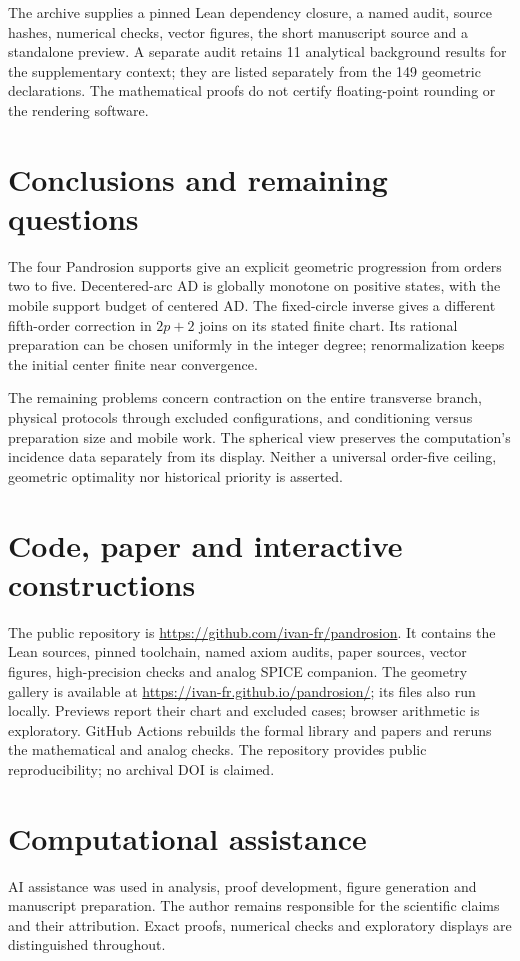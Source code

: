 \documentclass[11pt,a4paper]{article}
\theoremstyle{remark}\newtheorem{remark}[theorem]{Remark}
\begin{document}
The archive supplies a pinned Lean dependency closure, a named audit, source hashes, numerical checks, vector figures, the short manuscript source and a standalone preview. A separate audit retains 11 analytical background results for the supplementary context; they are listed separately from the 149 geometric declarations. The mathematical proofs do not certify floating-point rounding or the rendering software.

\section{Conclusions and remaining questions}
The four Pandrosion supports give an explicit geometric progression from orders two to five. Decentered-arc AD is globally monotone on positive states, with the mobile support budget of centered AD. The fixed-circle inverse gives a different fifth-order correction in $2p+2$ joins on its stated finite chart. Its rational preparation can be chosen uniformly in the integer degree; renormalization keeps the initial center finite near convergence.

The remaining problems concern contraction on the entire transverse branch, physical protocols through excluded configurations, and conditioning versus preparation size and mobile work. The spherical view preserves the computation's incidence data separately from its display. Neither a universal order-five ceiling, geometric optimality nor historical priority is asserted.

\section*{Code, paper and interactive constructions}
The public repository is \url{https://github.com/ivan-fr/pandrosion}. It contains the Lean sources, pinned toolchain, named axiom audits, paper sources, vector figures, high-precision checks and analog SPICE companion. The geometry gallery is available at \url{https://ivan-fr.github.io/pandrosion/}; its files also run locally. Previews report their chart and excluded cases; browser arithmetic is exploratory. GitHub Actions rebuilds the formal library and papers and reruns the mathematical and analog checks. The repository provides public reproducibility; no archival DOI is claimed.

\section*{Computational assistance}
AI assistance was used in analysis, proof development, figure generation and manuscript preparation. The author remains responsible for the scientific claims and their attribution. Exact proofs, numerical checks and exploratory displays are distinguished throughout.

\begingroup
\small
\setlength{\bibsep}{1.5pt}


\endgroup
\end{document}
